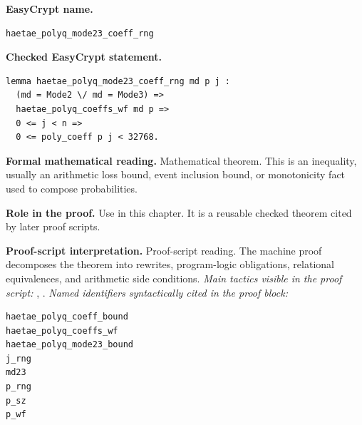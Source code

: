 \begin{formaltheorem}
\noindent\textbf{EasyCrypt name.}
\begin{lstlisting}[language=EasyCrypt,basicstyle=\ttfamily\scriptsize]
haetae_polyq_mode23_coeff_rng
\end{lstlisting}
\noindent\textbf{Checked EasyCrypt statement.}
\begin{lstlisting}[language=EasyCrypt,basicstyle=\ttfamily\scriptsize]
lemma haetae_polyq_mode23_coeff_rng md p j :
  (md = Mode2 \/ md = Mode3) =>
  haetae_polyq_coeffs_wf md p =>
  0 <= j < n =>
  0 <= poly_coeff p j < 32768.
\end{lstlisting}
\noindent\textbf{Formal mathematical reading.}
Mathematical theorem. This is an inequality, usually an arithmetic loss bound, event inclusion bound, or monotonicity fact used to compose probabilities.

\noindent\textbf{Role in the proof.}
Use in this chapter. It is a reusable checked theorem cited by later proof scripts.

\noindent\textbf{Proof-script interpretation.}
Proof-script reading. The machine proof decomposes the theorem into rewrites, program-logic obligations, relational equivalences, and arithmetic side conditions.
\emph{Main tactics visible in the proof script:} , .
\emph{Named identifiers syntactically cited in the proof block:}
\begin{lstlisting}[language=EasyCrypt,basicstyle=\ttfamily\scriptsize]
haetae_polyq_coeff_bound
haetae_polyq_coeffs_wf
haetae_polyq_mode23_bound
j_rng
md23
p_rng
p_sz
p_wf
\end{lstlisting}

\end{formaltheorem}

